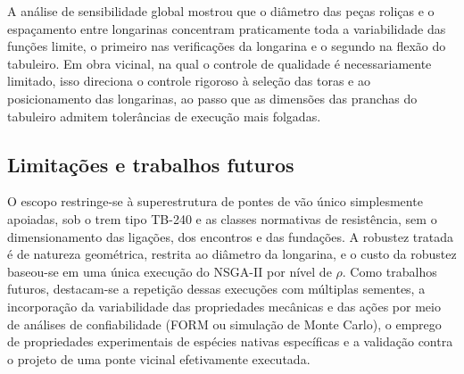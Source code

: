 A análise de sensibilidade global mostrou que o diâmetro das peças roliças e o espaçamento entre longarinas concentram praticamente toda a variabilidade das funções limite, o primeiro nas verificações da longarina e o segundo na flexão do tabuleiro.
Em obra vicinal, na qual o controle de qualidade é necessariamente limitado, isso direciona o controle rigoroso à seleção das toras e ao posicionamento das longarinas, ao passo que as dimensões das pranchas do tabuleiro admitem tolerâncias de execução mais folgadas.

\subsection*{Limitações e trabalhos futuros}

O escopo restringe-se à superestrutura de pontes de vão único simplesmente apoiadas, sob o trem tipo TB-240 e as classes normativas de resistência, sem o dimensionamento das ligações, dos encontros e das fundações.
A robustez tratada é de natureza geométrica, restrita ao diâmetro da longarina, e o custo da robustez baseou-se em uma única execução do NSGA-II por nível de $\rho$.
Como trabalhos futuros, destacam-se a repetição dessas execuções com múltiplas sementes, a incorporação da variabilidade das propriedades mecânicas e das ações por meio de análises de confiabilidade (FORM ou simulação de Monte Carlo), o emprego de propriedades experimentais de espécies nativas específicas e a validação contra o projeto de uma ponte vicinal efetivamente executada.
